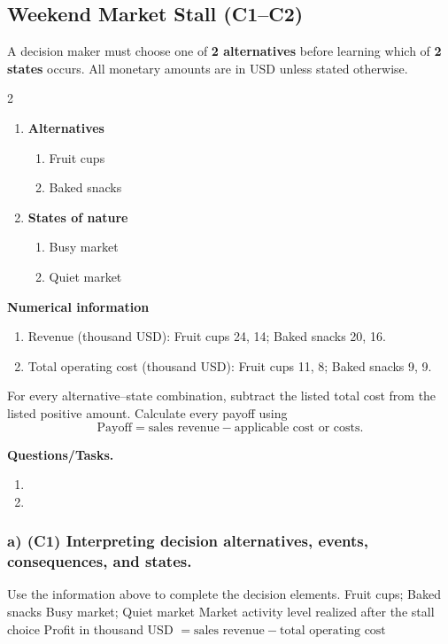\subsection{Weekend Market Stall (C1--C2)}
\label{sec:problem1-weekend-market-stall-c1-c2}
A decision maker must choose one of \textbf{2 alternatives} before learning which of \textbf{2 states} occurs. All monetary amounts are in USD unless stated otherwise.
\begin{multicols}{2}
	\begin{enumerate}[label=\arabic*.]
	 \item \textbf{Alternatives}
	 \begin{enumerate}[label=\roman*)]
	  \item Fruit cups
	  \item Baked snacks
	 \end{enumerate}
	 \item \textbf{States of nature}
	 \begin{enumerate}[label=\roman*)]
	  \item Busy market
	  \item Quiet market
	 \end{enumerate}
	\end{enumerate}
 \end{multicols}
 \textbf{Numerical information}
 \begin{enumerate}[label=\roman*)]
  \item Revenue (thousand USD): Fruit cups 24, 14; Baked snacks 20, 16.
  \item Total operating cost (thousand USD): Fruit cups 11, 8; Baked snacks 9, 9.
 \end{enumerate}


For every alternative--state combination, subtract the listed total cost from the listed positive amount. Calculate every payoff using
\[
 \text{Payoff}=\text{sales revenue}-\text{applicable cost or costs}.
\]

\textbf{Questions/Tasks.}
\begin{enumerate}[label=\textbf{\alph*)}]
 \item {}
 \item {}
\end{enumerate}
\subsubsection*{a) \textbf{(C1)} Interpreting decision alternatives, events, consequences, and states.}
\label{subsec:problem1-weekend-market-stall-c1}
Use the information above to complete the decision elements.
\DecisionElementsTable
{Fruit cups; Baked snacks}
{Busy market; Quiet market}
{Market activity level realized after the stall choice}
{Profit in thousand USD $= \text{sales revenue} - \text{total operating cost}$}
